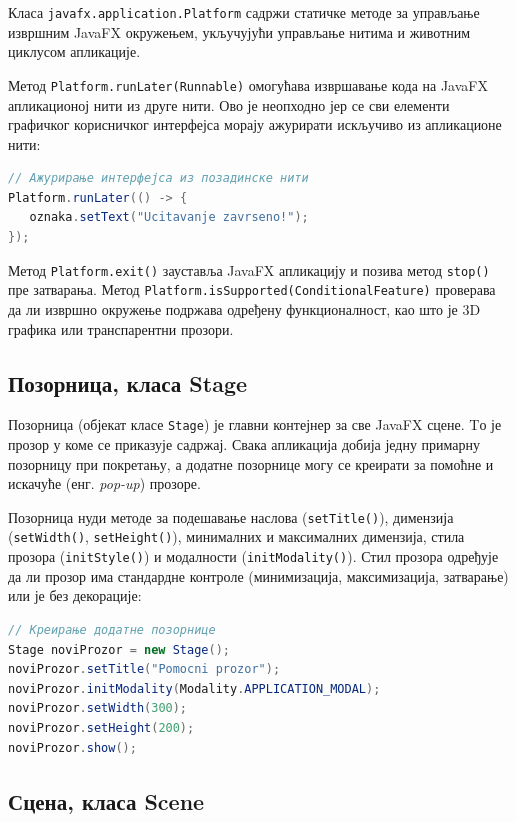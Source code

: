 Класа \texttt{javafx.application.Platform} садржи статичке методе за управљање извршним JavaFX окружењем, укључујући управљање нитима и животним циклусом апликације.

Метод \texttt{Platform.runLater(Runnable)} омогућава извршавање кода на JavaFX апликационој нити из друге нити. Ово је неопходно јер се сви елементи графичког корисничког интерфејса морају ажурирати искључиво из апликационе нити:


\begin{lstlisting}[language=Java]
// Ажурирање интерфејса из позадинске нити
Platform.runLater(() -> {
   oznaka.setText("Ucitavanje zavrseno!");
});
\end{lstlisting}


Метод \texttt{Platform.exit()} зауставља JavaFX апликацију и позива метод \texttt{stop()} пре затварања. Метод \texttt{Platform.isSupported(ConditionalFeature)} проверава да ли извршно окружење подржава одређену функционалност, као што је 3D графика или транспарентни прозори.


\subsection{Позорница, класа Stage}

Позорница (објекат класе \texttt{Stage}) је главни контејнер за све JavaFX сцене. Tо је прозор у коме се приказује садржај. Свака апликација добија једну примарну позорницу при покретању, а додатне позорнице могу се креирати за помоћне и искачуће (енг. \textit{pop-up}) прозоре.

Позорница нуди методе за подешавање наслова (\texttt{setTitle()}), димензија (\texttt{setWidth()}, \texttt{setHeight()}), минималних и максималних димензија, стила прозора (\texttt{initStyle()}) и модалности (\texttt{initModality()}). Стил прозора одређује да ли прозор има стандардне контроле (минимизација, максимизација, затварање) или је без декорације:


\begin{lstlisting}[language=Java]
// Креирање додатне позорнице
Stage noviProzor = new Stage();
noviProzor.setTitle("Pomocni prozor");
noviProzor.initModality(Modality.APPLICATION_MODAL);
noviProzor.setWidth(300);
noviProzor.setHeight(200);
noviProzor.show();
\end{lstlisting}


\subsection{Сцена, класа Scene}

